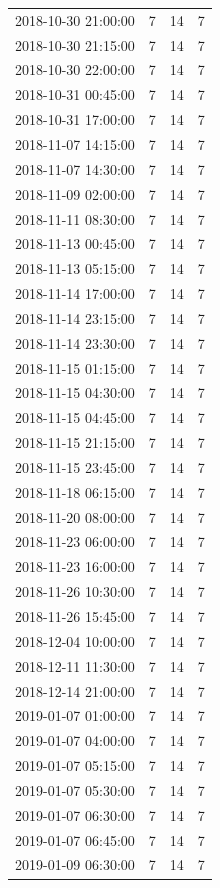 \begin{tabular}{lrrr}
2018-10-30 21:00:00 & 7 & 14 & 7 \\
2018-10-30 21:15:00 & 7 & 14 & 7 \\
2018-10-30 22:00:00 & 7 & 14 & 7 \\
2018-10-31 00:45:00 & 7 & 14 & 7 \\
2018-10-31 17:00:00 & 7 & 14 & 7 \\
2018-11-07 14:15:00 & 7 & 14 & 7 \\
2018-11-07 14:30:00 & 7 & 14 & 7 \\
2018-11-09 02:00:00 & 7 & 14 & 7 \\
2018-11-11 08:30:00 & 7 & 14 & 7 \\
2018-11-13 00:45:00 & 7 & 14 & 7 \\
2018-11-13 05:15:00 & 7 & 14 & 7 \\
2018-11-14 17:00:00 & 7 & 14 & 7 \\
2018-11-14 23:15:00 & 7 & 14 & 7 \\
2018-11-14 23:30:00 & 7 & 14 & 7 \\
2018-11-15 01:15:00 & 7 & 14 & 7 \\
2018-11-15 04:30:00 & 7 & 14 & 7 \\
2018-11-15 04:45:00 & 7 & 14 & 7 \\
2018-11-15 21:15:00 & 7 & 14 & 7 \\
2018-11-15 23:45:00 & 7 & 14 & 7 \\
2018-11-18 06:15:00 & 7 & 14 & 7 \\
2018-11-20 08:00:00 & 7 & 14 & 7 \\
2018-11-23 06:00:00 & 7 & 14 & 7 \\
2018-11-23 16:00:00 & 7 & 14 & 7 \\
2018-11-26 10:30:00 & 7 & 14 & 7 \\
2018-11-26 15:45:00 & 7 & 14 & 7 \\
2018-12-04 10:00:00 & 7 & 14 & 7 \\
2018-12-11 11:30:00 & 7 & 14 & 7 \\
2018-12-14 21:00:00 & 7 & 14 & 7 \\
2019-01-07 01:00:00 & 7 & 14 & 7 \\
2019-01-07 04:00:00 & 7 & 14 & 7 \\
2019-01-07 05:15:00 & 7 & 14 & 7 \\
2019-01-07 05:30:00 & 7 & 14 & 7 \\
2019-01-07 06:30:00 & 7 & 14 & 7 \\
2019-01-07 06:45:00 & 7 & 14 & 7 \\
2019-01-09 06:30:00 & 7 & 14 & 7 \\

\end{tabular}
